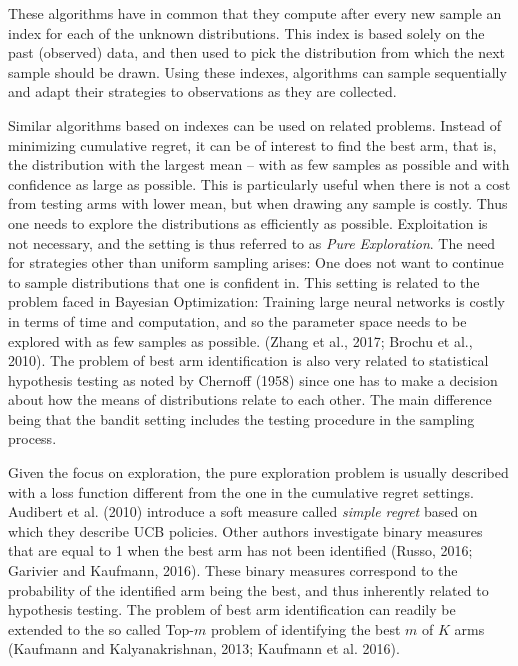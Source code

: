 \documentclass[11pt,]{article}
\begin{document}
These algorithms have in common that they compute after every new sample
an index for each of the unknown distributions. This index is based
solely on the past (observed) data, and then used to pick the
distribution from which the next sample should be drawn. Using these
indexes, algorithms can sample sequentially and adapt their strategies
to observations as they are collected.

Similar algorithms based on indexes can be used on related problems.
Instead of minimizing cumulative regret, it can be of interest to find
the best arm, that is, the distribution with the largest mean -- with as
few samples as possible and with confidence as large as possible. This
is particularly useful when there is not a cost from testing arms with
lower mean, but when drawing any sample is costly. Thus one needs to
explore the distributions as efficiently as possible. Exploitation is
not necessary, and the setting is thus referred to as \emph{Pure
Exploration}. The need for strategies other than uniform sampling
arises: One does not want to continue to sample distributions that one
is confident in. This setting is related to the problem faced in
Bayesian Optimization: Training large neural networks is costly in terms
of time and computation, and so the parameter space needs to be explored
with as few samples as possible. (Zhang et al., 2017; Brochu et al.,
2010). The problem of best arm identification is also very related to
statistical hypothesis testing as noted by Chernoff (1958) since one has
to make a decision about how the means of distributions relate to each
other. The main difference being that the bandit setting includes the
testing procedure in the sampling process.

Given the focus on exploration, the pure exploration problem is usually
described with a loss function different from the one in the cumulative
regret settings. Audibert et al. (2010) introduce a soft measure called
\emph{simple regret} based on which they describe UCB policies. Other
authors investigate binary measures that are equal to 1 when the best
arm has not been identified (Russo, 2016; Garivier and Kaufmann, 2016).
These binary measures correspond to the probability of the identified
arm being the best, and thus inherently related to hypothesis testing.
The problem of best arm identification can readily be extended to the so
called Top-\(m\) problem of identifying the best \(m\) of \(K\) arms
(Kaufmann and Kalyanakrishnan, 2013; Kaufmann et al. 2016).
\end{document}
